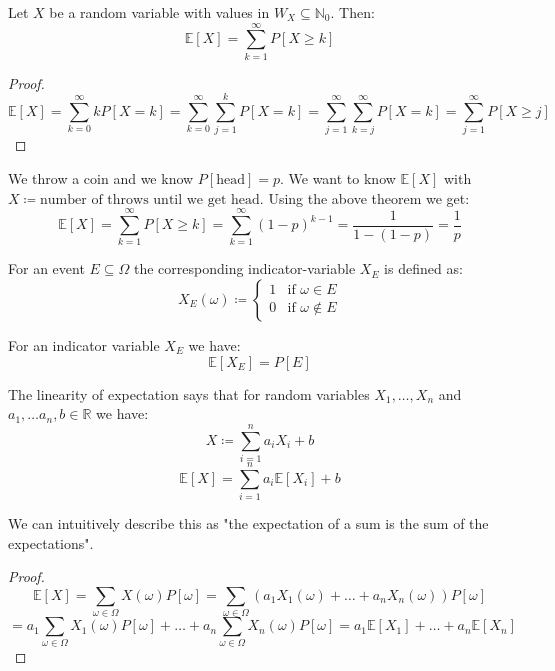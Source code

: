 \begin{theorem}
    Let $X$ be a random variable with values in $W_X \subseteq \mathbb{N}_0$. Then:
    $$\mathbb{E}[X] = \sum_{k=1}^\infty P[X \geq k]$$
\end{theorem}

\begin{proof}
    $$\mathbb{E}[X] = \sum_{k=0}^\infty k P[X=k] = \sum_{k=0}^\infty \sum_{j=1}^k P[X=k] = \sum_{j=1}^\infty \sum_{k=j}^\infty P[X=k] = \sum_{j=1}^\infty P[X \geq j]$$
\end{proof}

\begin{example}
    We throw a coin and we know $P[\text{head}] = p$. We want to know $\mathbb{E}[X]$ with $X \coloneqq \text{number of throws until we get head}$. Using the above theorem we get:
    $$\mathbb{E}[X] = \sum_{k=1}^\infty P[X \geq k] = \sum_{k=1}^\infty (1-p)^{k-1} = \frac{1}{1-(1-p)} = \frac{1}{p}$$
\end{example}

\begin{definition}
    For an event $E \subseteq \Omega$ the corresponding indicator-variable $X_E$ is defined as:
    $$ X_E(\omega) \coloneqq \begin{cases} 1 & \text{if } \omega \in E \\ 0 & \text{if } \omega \notin E \end{cases}$$
\end{definition}

\begin{remark}
    For an indicator variable $X_E$ we have:
    $$\mathbb{E}[X_E] = P[E]$$
\end{remark}

\begin{theorem}
    The linearity of expectation says that for random variables $X_1, \dots, X_n$  and $a_1, \dots a_n, b \in \mathbb{R}$ we have:
    $$X \coloneqq \sum_{i=1}^n a_i X_i + b$$
    $$\mathbb{E}[X] = \sum_{i=1}^n a_i \mathbb{E}[X_i] + b$$
\end{theorem}

\begin{remark}
    We can intuitively describe this as "the expectation of a sum is the sum of the expectations".
\end{remark}

\begin{proof}
    $$\mathbb{E}[X] = \sum_{\omega \in \Omega} X(\omega) P[\omega] = \sum_{\omega \in \Omega} (a_1 X_1(\omega) + \dots + a_n X_n(\omega)) P[\omega]$$
    $$ = a_1 \sum_{\omega \in \Omega} X_1(\omega) P[\omega] + \dots + a_n \sum_{\omega \in \Omega} X_n(\omega) P[\omega] = a_1 \mathbb{E}[X_1] + \dots + a_n \mathbb{E}[X_n]$$
\end{proof}

